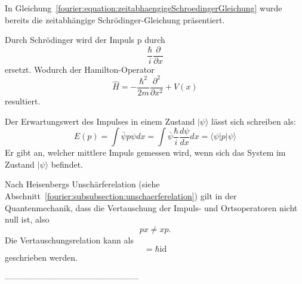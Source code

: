	In Gleichung~\ref{fourier:equation:zeitabhaengigeSchroedingerGleichung} wurde bereits die zeitabhängige Schrödinger-Gleichung präsentiert. %


	Durch Schrödinger wird der Impuls p durch
	\begin{equation}
		\frac{\hbar}{i} \frac{\partial}{\partial x}
	\end{equation}
	ersetzt.
	Wodurch der Hamilton-Operator
	\begin{equation}
		\hat{H} = -\frac{\hbar^2}{2m}\frac{\partial^2}{\partial x^2} + V(x)
	\end{equation}	
	resultiert.

	Der Erwartungswert des Impulses in einem Zustand $|\psi\rangle$ lässt sich schreiben als:
	\begin{equation}
		E(p) = \int \bar{\psi}p\psi dx
		= \int \bar{\psi} \frac{\hbar}{i} \frac{d\psi}{dx} dx
		= \langle \psi | p | \psi \rangle
	\end{equation}
	Er gibt an, welcher mittlere Impuls gemessen wird, wenn sich das System im Zustand $|\psi\rangle$ befindet.

	Nach Heisenbergs Unschärferelation (siehe Abschnitt~\ref{fourier:subsubsection:unschaerferelation}) gilt in der Quantenmechanik, dass die Vertauschung der Impuls- und Ortsoperatoren nicht null ist, also
	\begin{equation}
		px \neq xp.
	\end{equation}
	Die Vertauschungsrelation kann als
	\begin{equation}
		[x, p] = \hbar \text{id}
	\end{equation}
	geschrieben werden.



------------------------------------------------ %

